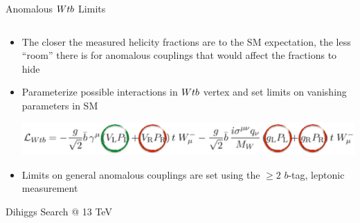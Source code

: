 \documentclass{beamer}
\newcommand*{\Wtb}{\ensuremath{W\lowercase{tb}}\xspace}
\begin{document}
{\begin{frame}{Anomalous \Wtb Limits}
\begin{columns}
    \end{columns}
    \vspace{-5pt}    
    \begin{itemize}\footnotesize
    \item The closer the measured helicity fractions are to the SM expectation, the less ``room'' there is for anomalous couplings that would affect the fractions to hide
    \item Parameterize possible interactions in $\Wtb$ vertex and set limits on vanishing parameters in SM
      \begin{center}\includegraphics[width=.8\textwidth]{figures/lagrangian}\end{center}
    \item Limits on general anomalous couplings are set using the $\geq2$ $b$-tag, leptonic measurement
    \end{itemize}
  \end{frame}

  \begin{frame}
    \vspace{40pt}
    \begin{center}
      \huge
      Dihiggs Search @ 13 TeV
    \end{center}
  \end{frame}

}
\end{document}
